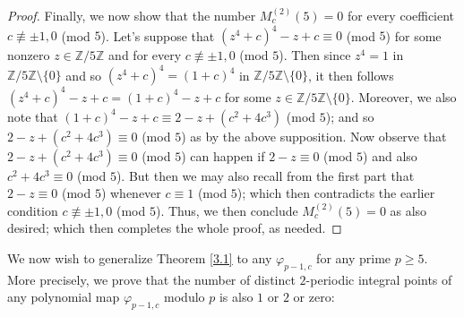 \documentclass{article}
\theoremstyle{plain}
\theoremstyle{definition}
\begin{document}
\begin{proof}
Finally, we now show that the number $M_{c}^{(2)}(5) = 0$ for every coefficient $c\not \equiv \pm1, 0$ (mod $5$). Let's suppose that $(z^4+c)^4 - z + c\equiv 0$ (mod $5$) for some nonzero $z\in \mathbb{Z}\slash 5\mathbb{Z}$ and for every $c\not \equiv \pm1, 0$ (mod $5$). Then since $z^4 = 1$ in $\mathbb{Z}\slash 5 \mathbb{Z}\setminus\{0\}$ and so $(z^4 + c)^4 = (1 + c)^4$ in $\mathbb{Z}\slash 5 \mathbb{Z}\setminus \{0\}$, it then follows $(z^4+c)^4 - z + c = (1+c)^4 - z + c$ for some $z\in \mathbb{Z}\slash 5 \mathbb{Z}\setminus \{0\}$. Moreover, we also note that $(1+c)^4 - z + c\equiv 2-z + (c^2 + 4c^3)$ (mod $5$); and so $2-z + (c^2 + 4c^3)\equiv 0$ (mod $5$) as by the above supposition. Now observe that $2-z + (c^2 + 4c^3)\equiv 0$ (mod $5$) can happen if $2-z\equiv 0$ (mod $5$) and also $c^2 + 4c^3\equiv 0$ (mod $5$). But then we may also recall from the first part that $2-z\equiv 0$ (mod $5$) whenever $c\equiv 1$ (mod $5$); which then contradicts the earlier condition $c\not \equiv \pm1, 0$ (mod $5$). Thus, we then conclude $M_{c}^{(2)}(5) = 0$ as also desired; which then completes the whole proof, as needed. 
\end{proof} 
We now wish to generalize Theorem \ref{3.1} to any $\varphi_{p-1, c}$ for any prime $p\geq 5$. More precisely, we prove that the number of distinct $2$-periodic integral points of any polynomial map $\varphi_{p-1, c}$ modulo $p$ is also $1$ or $2$ or zero:
\end{document}
